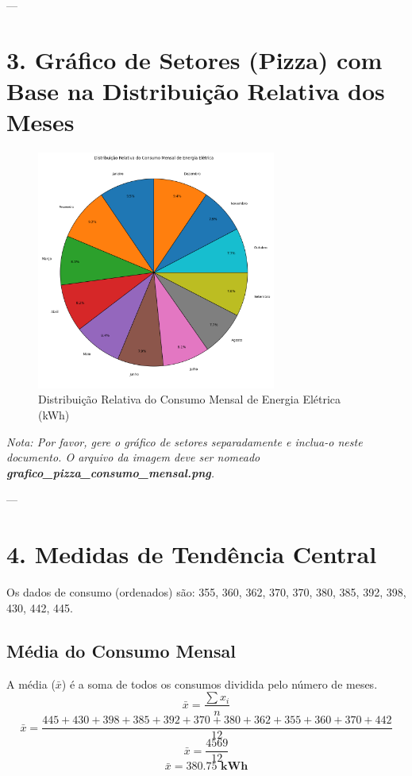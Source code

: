 \documentclass{article}
\begin{document}
---

\section*{3. Gráfico de Setores (Pizza) com Base na Distribuição Relativa dos Meses}

\begin{figure}[H]
    \centering
    \includegraphics[width=0.7\textwidth]{grafico_pizza_consumo_mensal.png} %
    \caption{Distribuição Relativa do Consumo Mensal de Energia Elétrica (kWh)}
    \label{fig:pie_chart}
\end{figure}
\textit{Nota: Por favor, gere o gráfico de setores separadamente e inclua-o neste documento. O arquivo da imagem deve ser nomeado \textbf{grafico\_pizza\_consumo\_mensal.png}.}

---

\section*{4. Medidas de Tendência Central}

Os dados de consumo (ordenados) são: 355, 360, 362, 370, 370, 380, 385, 392, 398, 430, 442, 445.

\subsection*{Média do Consumo Mensal}

A média ($\bar{x}$) é a soma de todos os consumos dividida pelo número de meses.
$$ \bar{x} = \frac{\sum x_i}{n} $$
$$ \bar{x} = \frac{445 + 430 + 398 + 385 + 392 + 370 + 380 + 362 + 355 + 360 + 370 + 442}{12} $$
$$ \bar{x} = \frac{4569}{12} $$
$$ \bar{x} = \mathbf{380.75 \text{ kWh}} $$
\end{document}

